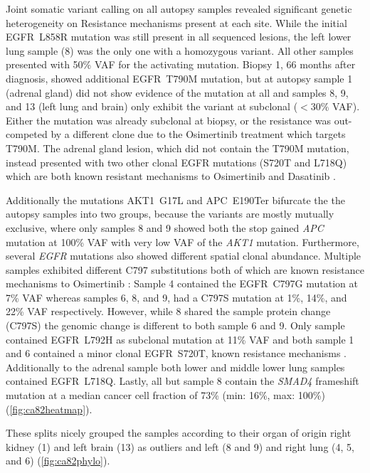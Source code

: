 Joint somatic variant calling on all autopsy samples revealed significant genetic heterogeneity on Resistance mechanisms present at each site. While the initial EGFR~L858R mutation was still present in all sequenced lesions, the left lower lung sample (8) was the only one with a homozygous variant. All other samples presented with 50\% VAF for the activating mutation. Biopsy 1, 66 months after diagnosis, showed additional EGFR~T790M mutation, but at autopsy sample 1 (adrenal gland) did not show evidence of the mutation at all and samples 8, 9, and 13 (left lung and brain) only exhibit the variant at subclonal ($<30\%$ VAF). Either the mutation was already subclonal at biopsy, or the resistance was out-competed by a different clone due to the Osimertinib treatment which targets T790M. The adrenal gland lesion, which did not contain the T790M mutation, instead presented with two other clonal EGFR mutations (S720T and L718Q) which are both known resistant mechanisms to Osimertinib and Dasatinib \cite{Johnson2010,Bersanelli2016}.

Additionally the mutations AKT1~G17L and APC~E190Ter bifurcate the the autopsy samples into two groups, because the variants are mostly mutually exclusive, where only samples 8 and 9 showed both the stop gained \textit{APC} mutation at 100\% VAF with very low VAF of the \textit{AKT1} mutation. Furthermore, several \textit{EGFR} mutations also showed different spatial clonal abundance. Multiple samples exhibited different C797 substitutions both of which are known resistance mechanisms to Osimertinib \cite{Wang2016,Leonetti2019}: Sample 4 contained the EGFR~C797G mutation at 7\% VAF whereas samples 6, 8, and 9, had a C797S mutation at 1\%, 14\%, and 22\% VAF respectively. However, while 8 shared the sample protein change (C797S) the genomic change is different to both sample 6 and 9. Only sample contained EGFR~L792H as subclonal mutation at 11\% VAF and both sample 1 and 6 contained a minor clonal EGFR~S720T, known resistance mechanisms \cite{Johnson2010,Zhang2018b}. Additionally to the adrenal sample both lower and middle lower lung samples contained EGFR~L718Q. 
Lastly, all but sample 8 contain the \textit{SMAD4} frameshift mutation at a median cancer cell fraction of 73\% (min: 16\%, max: 100\%) (\autoref{fig:ca82heatmap}).

These splits nicely grouped the samples according to their organ of origin right kidney (1) and left brain (13) as outliers and left (8 and 9) and right lung (4, 5, and 6) (\autoref{fig:ca82phylo}).


